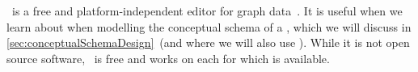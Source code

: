 %
%
\label{sec:installingYed}%
%
\yEd\ is a free and platform-independent editor for graph data~\cite{SG2015MDAWY,Y2011YGEM}.
It is useful when we learn about  when modelling the conceptual schema of a \db, which we will discuss in \cref{sec:conceptualSchemaDesign}~(and where we will also use \yEd).
While it is not open source software, \yEd\ is free and works on each  for which  is available.%
%
%
%
\endhsection%
%
